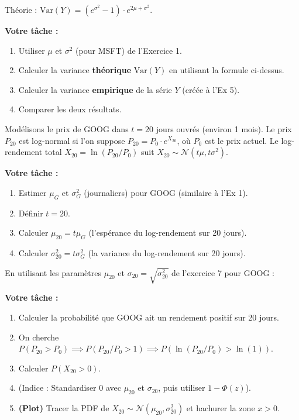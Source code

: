 \begin{exercicebox}
Théorie : $\text{Var}(Y) = (e^{\sigma^2} - 1) \cdot e^{2\mu + \sigma^2}$.

\textbf{Votre tâche :}
\begin{enumerate}
    \item Utiliser $\mu$ et $\sigma^2$ (pour MSFT) de l'Exercice 1.
    \item Calculer la variance \textbf{théorique} $\text{Var}(Y)$ en utilisant la formule ci-dessus.
    \item Calculer la variance \textbf{empirique} de la série $Y$ (créée à l'Ex 5).
    \item Comparer les deux résultats.
\end{enumerate}
\end{exercicebox}

\begin{exercicebox}
Modélisons le prix de GOOG dans $t=20$ jours ouvrés (environ 1 mois).
Le prix $P_{20}$ est log-normal si l'on suppose $P_{20} = P_0 \cdot e^{X_{20}}$, où $P_0$ est le prix actuel.
Le log-rendement total $X_{20} = \ln(P_{20}/P_0)$ suit $X_{20} \sim \mathcal{N}(t\mu, t\sigma^2)$.

\textbf{Votre tâche :}
\begin{enumerate}
    \item Estimer $\mu_G$ et $\sigma_G^2$ (journaliers) pour GOOG (similaire à l'Ex 1).
    \item Définir $t=20$.
    \item Calculer $\mu_{20} = t\mu_G$ (l'espérance du log-rendement sur 20 jours).
    \item Calculer $\sigma_{20}^2 = t\sigma_G^2$ (la variance du log-rendement sur 20 jours).
\end{enumerate}
\end{exercicebox}

\begin{exercicebox}
En utilisant les paramètres $\mu_{20}$ et $\sigma_{20} = \sqrt{\sigma_{20}^2}$ de l'exercice 7 pour GOOG :

\textbf{Votre tâche :}
\begin{enumerate}
    \item Calculer la probabilité que GOOG ait un rendement positif sur 20 jours.
    \item On cherche $P(P_{20} > P_0) \implies P(P_{20}/P_0 > 1) \implies P(\ln(P_{20}/P_0) > \ln(1))$.
    \item Calculer $P(X_{20} > 0)$.
    \item (Indice : Standardiser 0 avec $\mu_{20}$ et $\sigma_{20}$, puis utiliser $1 - \Phi(z)$).
    \item \textbf{(Plot)} Tracer la PDF de $X_{20} \sim \mathcal{N}(\mu_{20}, \sigma_{20}^2)$ et hachurer la zone $x > 0$.
\end{enumerate}
\end{exercicebox}

